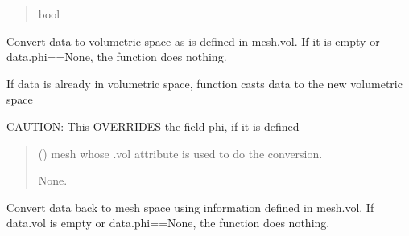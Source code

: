 \documentclass[letterpaper,10pt,english]{sphinxmanual}
\begin{document}
\begin{fulllineitems}
\begin{fulllineitems}
\begin{quote}
\begin{description}
\sphinxAtStartPar
bool

\end{description}\end{quote}

\end{fulllineitems}


\begin{fulllineitems}
\label{\detokenize{_autosummary/nirfasterff.base.data.TRMomentsdata:nirfasterff.base.data.TRMomentsdata.togrid}}
\pysigstartsignatures
{}
\pysigstopsignatures
\sphinxAtStartPar
Convert data to volumetric space as is defined in mesh.vol. If it is empty or data.phi==None, the function does nothing.

\sphinxAtStartPar
If data is already in volumetric space, function casts data to the new volumetric space

\sphinxAtStartPar
CAUTION: This OVERRIDES the field phi, if it is defined
\begin{quote}\begin{description}
\sphinxAtStartPar
{} () \textendash{} mesh whose .vol attribute is used to do the conversion.

\sphinxAtStartPar
None.

\end{description}\end{quote}

\end{fulllineitems}


\begin{fulllineitems}
\label{\detokenize{_autosummary/nirfasterff.base.data.TRMomentsdata:nirfasterff.base.data.TRMomentsdata.tomesh}}
\pysigstartsignatures
{}
\pysigstopsignatures
\sphinxAtStartPar
Convert data back to mesh space using information defined in mesh.vol. If data.vol is empty or data.phi==None, the function does nothing.


\end{fulllineitems}
\end{fulllineitems}
\end{document}
